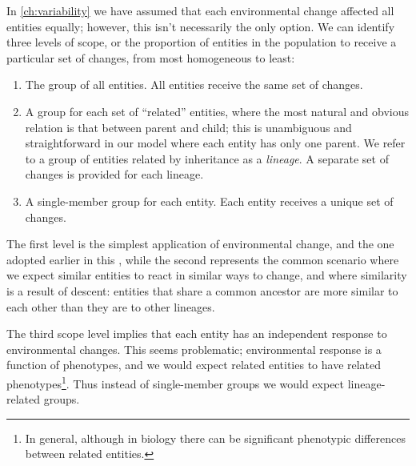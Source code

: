 In \cref{ch:variability} we have assumed that each environmental change affected all entities equally; however, this isn't necessarily the only option. We can identify three levels of scope, or the proportion of entities in the population to receive a particular set of changes, from most homogeneous to least:

\begin{enumerate}
	\item The group of all entities. All entities receive the same set of changes.
	\item A group for each set of ``related'' entities, where the most natural and obvious relation is that between parent and child; this is unambiguous and straightforward in our model where each entity has only one parent. We refer to a group of entities related by inheritance as a \emph{lineage}. A separate set of changes is provided for each lineage.
	\item A single-member group for each entity. Each entity receives a unique set of changes.
\end{enumerate}

The first level is the simplest application of environmental change, and the one adopted earlier in this , while the second represents the common scenario where we expect similar entities to react in similar ways to change, and where similarity is a result of descent: entities that share a common ancestor are more similar to each other than they are to other lineages. 

The third scope level implies that each entity has an independent response to environmental changes. This seems problematic; environmental response is a function of phenotypes, and we would expect related entities to have related phenotypes\footnote{In general, although in biology there can be significant phenotypic differences between related entities.}. Thus instead of single-member groups we would expect lineage-related groups.

